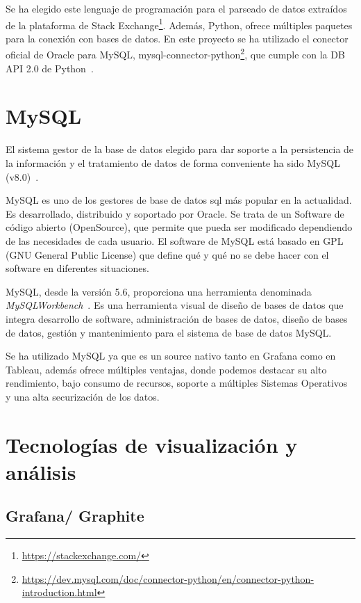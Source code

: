 \documentclass[a4paper, 12pt]{book}
\begin{document}
Se ha elegido este lenguaje de programación para el parseado de datos extraídos de la plataforma de Stack Exchange\footnote{\url{https://stackexchange.com/}}. Además, Python, ofrece múltiples paquetes para la conexión con bases de datos. En este proyecto se ha utilizado el conector oficial de Oracle para MySQL, mysql-connector-python\footnote{\url{https://dev.mysql.com/doc/connector-python/en/connector-python-introduction.html}}, que cumple con la DB API 2.0 de Python~\cite{Python}.

\section{MySQL} 
\label{sec:Mysql}

El sistema gestor de la base de datos elegido para dar soporte a la persistencia de la información y el tratamiento de datos de forma conveniente ha sido MySQL (v8.0)~\cite{MYSQL}.

MySQL es uno de los gestores de base de datos \gls{sql} más popular en la actualidad. Es desarrollado, distribuido y soportado por Oracle. Se trata de un Software de código abierto (OpenSource), que permite que pueda ser modificado dependiendo de las necesidades de cada usuario. El software de MySQL está basado en GPL (GNU General Public License) que define qué y qué no se debe hacer con el software en diferentes situaciones.

MySQL, desde la versión 5.6, proporciona una herramienta denominada  \textit{MySQLWorkbench}~\cite{krogh2020mysql}. Es una herramienta visual de diseño de bases de datos que integra desarrollo de software, administración de bases de datos, diseño de bases de datos, gestión y mantenimiento para el sistema de base de datos MySQL.

Se ha utilizado MySQL ya que es un source nativo tanto en Grafana como en Tableau, además ofrece múltiples ventajas, donde podemos destacar su alto rendimiento, bajo consumo de recursos, soporte a múltiples Sistemas Operativos y una alta securización de los datos.

\section{Tecnologías de visualización y análisis} 
\label{sec:Tenologias_va}
\subsection{Grafana/ Graphite} %
\label{sec:Grafana} %
\end{document}
